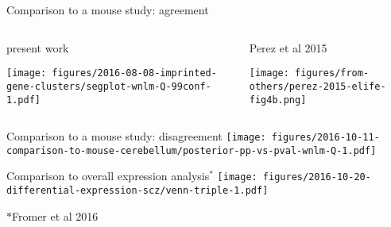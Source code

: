 \documentclass{beamer}
\newcommand{\ownfigscale}[0]{0.4}
\begin{document}
\begin{frame}{Comparison to a mouse study: agreement}
\begin{columns}[t]
\begin{column}{0.5\textwidth}
\begin{center}
present work

\texttt{[image: figures/2016-08-08-imprinted-gene-clusters/segplot-wnlm-Q-99conf-1.pdf]}

\end{center}
\end{column}

\begin{column}{0.5\textwidth}
\begin{center}
Perez et al 2015

\texttt{[image: figures/from-others/perez-2015-elife-fig4b.png]}
\end{center}
\end{column}
\end{columns}
\end{frame}

\begin{frame}{Comparison to a mouse study: disagreement}
\texttt{[image: figures/2016-10-11-comparison-to-mouse-cerebellum/posterior-pp-vs-pval-wnlm-Q-1.pdf]}
\end{frame}

\begin{frame}{Comparison to overall expression analysis\(^\ast\)}
\texttt{[image: figures/2016-10-20-differential-expression-scz/venn-triple-1.pdf]}

{\tiny\(\ast\)Fromer et al 2016}
\end{frame}
\end{document}
